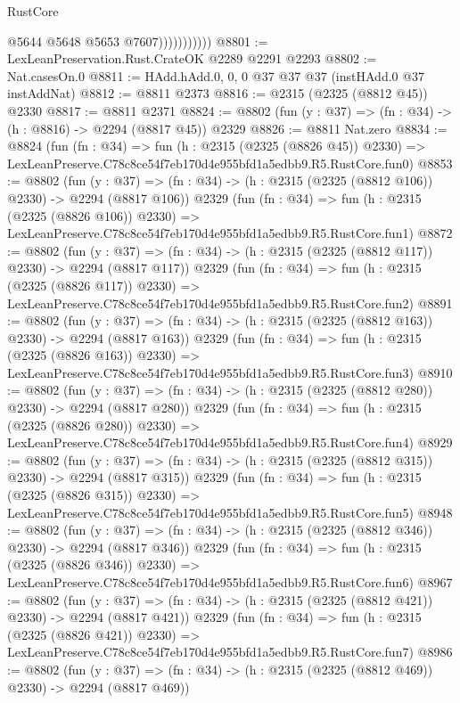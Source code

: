 \begin{lexlean}{RustCore}
\begin{coremodule}
                          @5644
                          @5648
                          @5653
                          @7607)))))))))))
@8801 := LexLeanPreservation.Rust.CrateOK @2289 @2291 @2293
@8802 := Nat.casesOn.{0}
@8811 := HAdd.hAdd.{0, 0, 0} @37 @37 @37 (instHAdd.{0} @37 instAddNat)
@8812 := @8811 @2373
@8816 := @2315 (@2325 (@8812 @45)) @2330
@8817 := @8811 @2371
@8824 := @8802 (fun (y : @37) => (fn : @34) -> (h : @8816) -> @2294 (@8817 @45)) @2329
@8826 := @8811 Nat.zero
@8834 := @8824
    (fun (fn : @34) =>
    fun (h : @2315 (@2325 (@8826 @45)) @2330) =>
    LexLeanPreserve.C78c8ce54f7eb170d4e955bfd1a5edbb9.R5.RustCore.fun0)
@8853 := @8802
    (fun (y : @37) => (fn : @34) -> (h : @2315 (@2325 (@8812 @106)) @2330) -> @2294 (@8817 @106))
    @2329
    (fun (fn : @34) =>
    fun (h : @2315 (@2325 (@8826 @106)) @2330) =>
    LexLeanPreserve.C78c8ce54f7eb170d4e955bfd1a5edbb9.R5.RustCore.fun1)
@8872 := @8802
    (fun (y : @37) => (fn : @34) -> (h : @2315 (@2325 (@8812 @117)) @2330) -> @2294 (@8817 @117))
    @2329
    (fun (fn : @34) =>
    fun (h : @2315 (@2325 (@8826 @117)) @2330) =>
    LexLeanPreserve.C78c8ce54f7eb170d4e955bfd1a5edbb9.R5.RustCore.fun2)
@8891 := @8802
    (fun (y : @37) => (fn : @34) -> (h : @2315 (@2325 (@8812 @163)) @2330) -> @2294 (@8817 @163))
    @2329
    (fun (fn : @34) =>
    fun (h : @2315 (@2325 (@8826 @163)) @2330) =>
    LexLeanPreserve.C78c8ce54f7eb170d4e955bfd1a5edbb9.R5.RustCore.fun3)
@8910 := @8802
    (fun (y : @37) => (fn : @34) -> (h : @2315 (@2325 (@8812 @280)) @2330) -> @2294 (@8817 @280))
    @2329
    (fun (fn : @34) =>
    fun (h : @2315 (@2325 (@8826 @280)) @2330) =>
    LexLeanPreserve.C78c8ce54f7eb170d4e955bfd1a5edbb9.R5.RustCore.fun4)
@8929 := @8802
    (fun (y : @37) => (fn : @34) -> (h : @2315 (@2325 (@8812 @315)) @2330) -> @2294 (@8817 @315))
    @2329
    (fun (fn : @34) =>
    fun (h : @2315 (@2325 (@8826 @315)) @2330) =>
    LexLeanPreserve.C78c8ce54f7eb170d4e955bfd1a5edbb9.R5.RustCore.fun5)
@8948 := @8802
    (fun (y : @37) => (fn : @34) -> (h : @2315 (@2325 (@8812 @346)) @2330) -> @2294 (@8817 @346))
    @2329
    (fun (fn : @34) =>
    fun (h : @2315 (@2325 (@8826 @346)) @2330) =>
    LexLeanPreserve.C78c8ce54f7eb170d4e955bfd1a5edbb9.R5.RustCore.fun6)
@8967 := @8802
    (fun (y : @37) => (fn : @34) -> (h : @2315 (@2325 (@8812 @421)) @2330) -> @2294 (@8817 @421))
    @2329
    (fun (fn : @34) =>
    fun (h : @2315 (@2325 (@8826 @421)) @2330) =>
    LexLeanPreserve.C78c8ce54f7eb170d4e955bfd1a5edbb9.R5.RustCore.fun7)
@8986 := @8802
    (fun (y : @37) => (fn : @34) -> (h : @2315 (@2325 (@8812 @469)) @2330) -> @2294 (@8817 @469))

\end{coremodule}
\end{lexlean}
